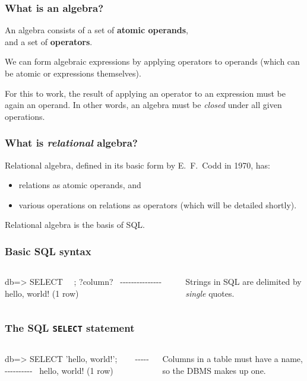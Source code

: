 \documentclass[english,serif,mathserif]{beamer}
\begin{document}
\begin{frame}
  \frametitle{What is an algebra?}
  An algebra consists of a set of \textbf{atomic operands}, \\
  and a set of \textbf{operators}.

  \+
  We can form algebraic expressions by applying operators to operands
  \alert{(which can be atomic or expressions themselves)}.

  \+
  For this to work, the result of applying an operator to an expression must be
  again an operand.  In other words, an algebra must be \emph{closed} under all
  given operations.
\end{frame}


\begin{frame}
  \frametitle{What is \emph{relational} algebra?}

  Relational algebra, defined in its basic form by E.~F.~Codd in 1970, has:
  \begin{itemize}
  \item relations as atomic operands, and
  \item various operations on relations as operators (which will be detailed shortly).
  \end{itemize}

  \+
  Relational algebra is the basis of SQL.
\end{frame}


\begin{frame}[fragile]
  \frametitle{Basic SQL syntax}
  \smaller

  \begin{columns}
    \begin{column}{0.5\linewidth}
\begin{sql}
db=> SELECT ~~;
   ?column?
~-{}-{}-{}-{}-{}-{}-{}-{}-{}-{}-{}-{}-{}-{}-{}~
 hello, world!
(1 row)
\end{sql}
    \end{column}
    \begin{column}{0.5\linewidth}
    Strings in SQL are delimited by \emph{single} quotes.
    \end{column}
  \end{columns}
\end{frame}


\begin{frame}[fragile]
  \frametitle{The SQL \texttt{SELECT} statement}
  \smaller

  \begin{columns}
    \begin{column}{0.5\linewidth}
\begin{sql}
db=> SELECT 'hello, world!';
   ~~
~-{}-{}-{}-{}-{}-{}-{}-{}-{}-{}-{}-{}-{}-{}-{}~
 hello, world!
(1 row)
\end{sql}
    \end{column}
    \begin{column}{0.5\linewidth}
    Columns in a table must have a name, so the DBMS makes up one.
    \end{column}
  \end{columns}
\end{frame}
\end{document}
